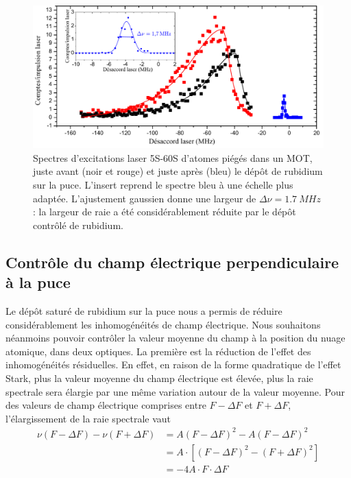 \begin{figure}[h]
\centering
\includegraphics[width=\linewidth]{figures/setup/rydberg/avant-apres-coating}
\caption[Spectres d'excitations laser 5S-60S avant et après le dépôt de rubidium sur la puce]{
Spectres d'excitations laser 5S-60S d'atomes piégés dans un MOT, juste avant (noir et rouge) et juste après (bleu) le dépôt de rubidium sur la puce.
L'insert reprend le spectre bleu à une échelle plus adaptée.
L'ajustement gaussien donne une largeur de $\Delta\nu=\SI{1.7}{MHz}$ :
la largeur de raie a été considérablement réduite par le dépôt contrôlé de rubidium.
}
\label{fig:raiefine_depot}
\end{figure}


\subsection{Contrôle du champ électrique perpendiculaire à la puce}\label{subsec:compensation}
\noindent Le dépôt saturé de rubidium sur la puce nous a permis de réduire considérablement les inhomogénéités de champ électrique.
Nous souhaitons néanmoins pouvoir contrôler la valeur moyenne du champ à la position du nuage atomique, dans deux optiques.
La première est la réduction de l'effet des inhomogénéités résiduelles.
En effet, en raison de la forme quadratique de l'effet Stark, plus la valeur moyenne du champ électrique est élevée, plus la raie spectrale sera élargie par une même variation autour de la valeur moyenne.
Pour des valeurs de champ électrique comprises entre $F-\Delta F$ et $F + \Delta F$, l'élargissement de la raie spectrale vaut
%
\begin{equation}
\label{eq:Stark_broadening}
\begin{aligned}
\nu(F-\Delta F) - \nu(F+\Delta F) &= A (F-\Delta F)^2 - A (F-\Delta F)^2 \\
&= A\cdot [(F-\Delta F)^2 - (F+\Delta F)^2] \\
&= -4A \cdot F\cdot \Delta F
\end{aligned}
\end{equation}

